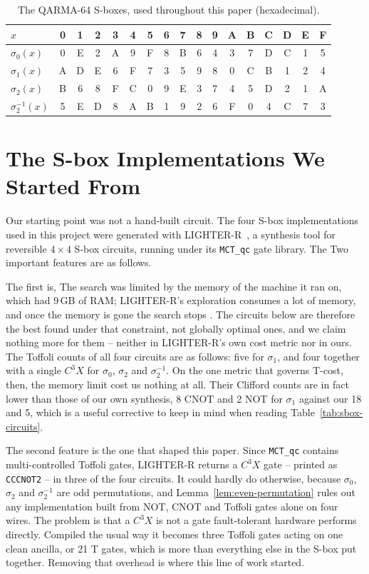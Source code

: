 \documentclass[runningheads,10pt]{llncs}
\begin{document}
\begin{table}[htbp]
\centering
\caption{The QARMA-64 S-boxes, used throughout this paper (hexadecimal).}
\label{tab:sboxes}
\begin{tabular}{l*{16}{c}}
\toprule
$x$ & 0 & 1 & 2 & 3 & 4 & 5 & 6 & 7 & 8 & 9 & A & B & C & D & E & F \\
\midrule
$\sigma_0(x)$ & 0 & E & 2 & A & 9 & F & 8 & B & 6 & 4 & 3 & 7 & D & C & 1 & 5 \\
$\sigma_1(x)$ & A & D & E & 6 & F & 7 & 3 & 5 & 9 & 8 & 0 & C & B & 1 & 2 & 4 \\
$\sigma_2(x)$ & B & 6 & 8 & F & C & 0 & 9 & E & 3 & 7 & 4 & 5 & D & 2 & 1 & A \\
$\sigma_2^{-1}(x)$ & 5 & E & D & 8 & A & B & 1 & 9 & 2 & 6 & F & 0 & 4 & C & 7 & 3 \\
\bottomrule
\end{tabular}
\end{table}

\section{The S-box Implementations We Started From}
\label{sec:sbox-implementations}

Our starting point was not a hand-built circuit. The four S-box implementations used in this project were generated with LIGHTER-R~\cite{dasu2019lighterr}, a synthesis tool for reversible $4\times4$ S-box circuits, running under its \texttt{MCT\_qc} gate library. The Two important features are as follows.

The first is,  The search was limited by the memory of the machine it ran on, which had 9\,GB of RAM; LIGHTER-R's exploration consumes a lot of memory, and once the memory  is gone the search stops . The circuits below are therefore the best found under that constraint, not globally optimal ones, and we claim nothing more for them -- neither in LIGHTER-R's own cost metric nor in ours. The Toffoli counts of all four circuits are as follows: five for $\sigma_1$, and four together with a single $C^3X$ for $\sigma_0$, $\sigma_2$ and $\sigma_2^{-1}$. On the one metric that governs T-cost, then, the memory limit cost us nothing at all. Their Clifford counts are in fact lower than those of our own synthesis, 8 CNOT and 2 NOT for $\sigma_1$ against our 18 and 5, which is a useful corrective to keep in mind when reading Table~\ref{tab:sbox-circuits}.

The second feature is the one that shaped this paper. Since \texttt{MCT\_qc} contains multi-controlled Toffoli gates, LIGHTER-R returns a $C^3X$ gate -- printed as \texttt{CCCNOT2} -- in three of the four circuits. It could hardly do otherwise, because $\sigma_0$, $\sigma_2$ and $\sigma_2^{-1}$ are odd permutations, and Lemma~\ref{lem:even-permutation} rules out any implementation built from NOT, CNOT and Toffoli gates alone on four wires. The problem is that a $C^3X$ is not a gate fault-tolerant hardware performs directly. Compiled the usual way it becomes three Toffoli gates acting on one clean ancilla, or 21 T gates, which is more than everything else in the S-box put together. Removing that overhead is where this line of work started.
\end{document}
